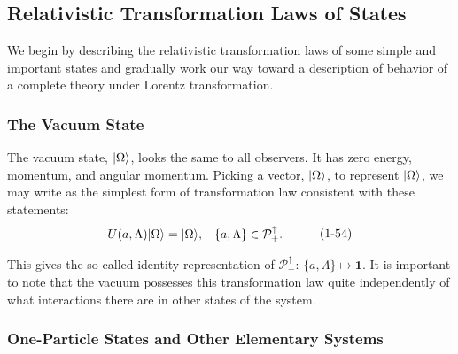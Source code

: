 \subsection{Relativistic Transformation Laws of States}\label{sec:1.4}

We begin by describing the relativistic transformation laws of some simple and
important states and gradually work our way toward a description of behavior of
a complete theory under Lorentz transformation.

\subsubsection{The Vacuum State}

The vacuum state, $\lvert \Omega\rangle$, looks the same to all observers. It has zero
energy, momentum, and angular momentum. Picking a vector, $\lvert \Omega\rangle$, to
represent $\lvert \Omega\rangle$, we may write as the simplest form of transformation
law consistent with these statements:
\begin{equation}
\begin{aligned}
  U(a,\Lambda)\lvert \Omega\rangle&=\lvert \Omega\rangle, &
  \{a,\Lambda\}&\in\mathcal{P}^{\uparrow}_{+}.
\end{aligned}
  \tag{1-54}\label{eq:1-54}
\end{equation}

This gives the so-called identity representation of $\mathcal{P}^{\uparrow}_{+}$:
$\{a,\Lambda\}\mathbin{\mapsto}\mathbf{1}$. It is important to note that the
vacuum possesses this transformation law quite independently of what
interactions there are in other states of the system.

\subsubsection{One-Particle States and Other Elementary Systems}

